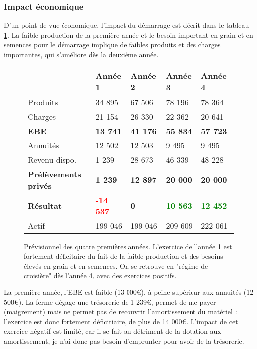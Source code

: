\documentclass{book}
\begin{document}
\subsubsection{Impact économique}

D'un point de vue économique, l'impact du démarrage est décrit dans le tableau \ref{tab:demarrage_eco}. La faible production de la première année et le besoin important en grain et en semences pour le démarrage implique de faibles produits et des charges importantes, qui s'améliore dès la deuxième année.

\begin{figure}[h!]
\footnotesize
\center
\begin{tabular}{ | p{3cm} | p{}| p{}| p{}| p{}| }
\hline
	& Année 1 & Année 2 & Année 3 & Année 4 \  \\ \hline
	Produits & 34 895 & 67 506 & 78 196 & 78 364 \\ \hline
	Charges & 21 154 & 26 330 & 22 362 & 20 641 \\ \hline
	\textbf{EBE} & \textbf{13 741} & \textbf{41 176} & \textbf{55 834} & \textbf{57 723} \\ \hline
	\hline
	Annuités & 12 502 & 12 503 & 9 495 & 9 495 \\ \hline
	Revenu dispo. & 1 239 & 28 673 & 46 339 & 48 228 \\ \hline
	\textbf{Prélèvements privés} & \textbf{1 239} & \textbf{12 897} & \textbf{20 000} & \textbf{20 000} \\ \hline
	\hline
	\textbf{Résultat} & \textbf{\textcolor{red}{-14 537}} & \textbf{0} & \textbf{\textcolor{green}{10 563}} & \textbf{\textcolor{green}{12 452}} \\ \hline
	Actif & 199 046 & 199 046 & 209 609 & 222 061 \\ \hline
\end{tabular}
\caption{Prévisionnel des quatre premières années. L'exercice de l'année 1 est fortement déficitaire du fait de la faible production et des besoins élevés en grain et en semences. On se retrouve en "régime de croisière" dès l'année 4, avec des exercices positifs.}
\label{tab:demarrage_eco}
\end{figure}

La première année, l'EBE est faible (13 000\euro{}), à peine supérieur aux annuités (12 500\euro{}). La ferme dégage une trésorerie de 1 239\euro{}, permet de me payer (maigrement) mais ne permet pas de recouvrir l'amortissement du matériel : l'exercice est donc fortement déficitiaire, de plus de 14 000\euro{}. L'impact de cet exercice négatif est limité, car il se fait au détriment de la dotation aux amortissement, je n'ai donc pas besoin d'emprunter pour avoir de la trésorerie.
\end{document}
